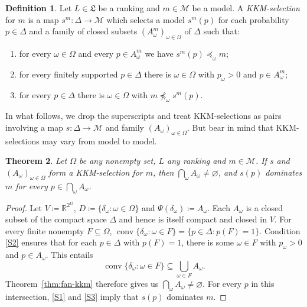 \documentclass[11pt]{article}
\newtheorem{theorem}{Theorem}[section]
\theoremstyle{definition}
\newtheorem{definition}[theorem]{Definition}
\theoremstyle{remark}
\newcommand{\M}{\mathcal M}
\begin{document}
\begin{definition}\label{def:selection}\label{def:selection-data}
Let $L\in\mathfrak L$ be a ranking and $m\in\M$ be a model. A \textit{KKM-selection} for $m$ is a map $s^m:\Delta\to\M$ which selects a model $s^m(p)$ for each probability $p\in\Delta$ and a family of closed subsets $(A^m_\omega)_{\omega\in\Omega}$ of $\Delta$ such that:
\begin{enumerate}[label=(S\arabic*),leftmargin=3em]
\item\label{S1} for every $\omega\in\Omega$ and every $p\in A^m_\omega$ we have $s^m(p)\preceq_\omega m$;
\item\label{S2} for every finitely supported $p\in\Delta$ there is $\omega\in\Omega$ with $p_\omega>0$ and $p\in A^m_\omega$;
\item\label{S3} for every $p\in\Delta$ there is $\omega\in\Omega$ with $m\not\preceq_\omega s^m(p)$.
\end{enumerate}
\end{definition}

In what follows, we drop the superscripts and treat KKM-selections as pairs involving a map $s:\Delta\to\M$ and family $(A_\omega)_{\omega\in\Omega}$. But bear in mind that KKM-selections may vary from model to model. 


\begin{theorem}\label{thm:selection}
Let $\Omega$ be any nonempty set, $L$ any ranking and $m\in\M$. If $s$ and $(A_\omega)_{\omega\in\Omega}$ form a KKM-selection for $m$, then $\bigcap_\omega A_\omega\ne\varnothing$, and $s(p)$ dominates $m$ for every $p\in\bigcap_\omega A_\omega$.
\end{theorem}
\begin{proof}
Let $V\coloneqq\mathbb R^{2^\Omega}$, $D\coloneqq\{\delta_\omega:\omega\in\Omega\}$ and $\Psi(\delta_\omega)\coloneqq A_\omega$. Each $A_\omega$ is a closed subset of the compact space $\Delta$ and hence is itself compact and closed in $V$. For every finite nonempty $F\subseteq\Omega$, $\operatorname{conv}\{\delta_\omega:\omega\in F\}=\{p\in\Delta:p(F)=1\}$. Condition \ref{S2} ensures that for each $p\in\Delta$ with $p(F)=1$, there is some $\omega\in F$ with $p_\omega>0$ and $p\in A_\omega$. This entails
\[
\operatorname{conv}\{\delta_\omega:\omega\in F\}
\subseteq\bigcup_{\omega\in F}A_\omega.
\]
Theorem~\ref{thm:fan-kkm} therefore gives us $\bigcap_\omega A_\omega\ne\varnothing$. For every $p$ in this intersection, \ref{S1} and \ref{S3} imply that $s(p)$ dominates $m$.
\end{proof}
\end{document}
